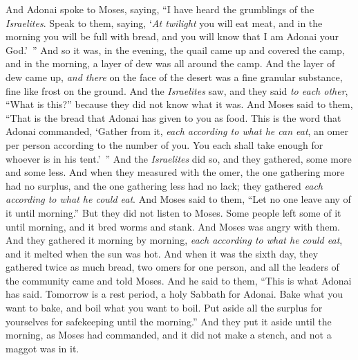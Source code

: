 \begin{biblechapter}
\verse And Adonai spoke to Moses, saying,
\verse “I have heard the grumblings of the \textit{Israelites}. Speak to them, saying, ‘\textit{At twilight} you will eat meat, and in the morning you will be full with bread, and you will know that I am Adonai your God.’ ”
\verse And so it was, in the evening, the quail came up and covered the camp, and in the morning, a layer of dew was all around the camp.
\verse And the layer of dew came up, \textit{and there} on the face of the desert was a fine granular substance, fine like frost on the ground.
\verse And the \textit{Israelites} saw, and they said \textit{to each other}, “What is this?” because they did not know what it was. And Moses said to them, “That is the bread that Adonai has given to you as food.
\verse This is the word that Adonai commanded, ‘Gather from it, \textit{each according to what he can eat}, an omer per person according to the number of you. You each shall take enough for whoever is in his tent.’ ”
\verse And the \textit{Israelites} did so, and they gathered, some more and some less.
\verse And when they measured with the omer, the one gathering more had no surplus, and the one gathering less had no lack; they gathered \textit{each according to what he could eat}.
\verse And Moses said to them, “Let no one leave any of it until morning.”
\verse But they did not listen to Moses. Some people left some of it until morning, and it bred worms and stank. And Moses was angry with them.
\verse And they gathered it morning by morning, \textit{each according to what he could eat}, and it melted when the sun was hot.
\verse And when it was the sixth day, they gathered twice as much bread, two omers for one person, and all the leaders of the community came and told Moses.
\verse And he said to them, “This is what Adonai has said. Tomorrow is a rest period, a holy Sabbath for Adonai. Bake what you want to bake, and boil what you want to boil. Put aside all the surplus for yourselves for safekeeping until the morning.”
\verse And they put it aside until the morning, as Moses had commanded, and it did not make a stench, and not a maggot was in it.

\end{biblechapter}
